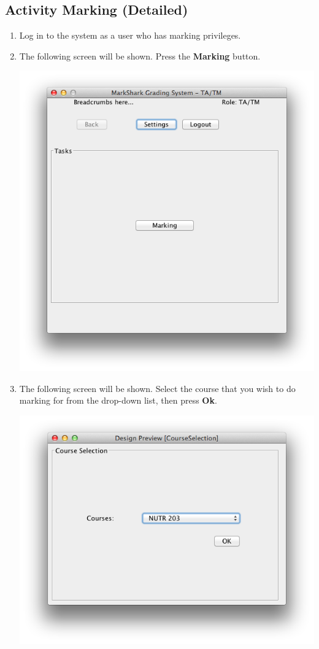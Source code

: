 \documentclass{article}
\begin{document}
\subsection{Activity Marking (Detailed)}
\begin{enumerate}
  \item Log in to the system as a user who has marking privileges.
  \item The following screen will be shown.  Press the \textbf{Marking} button.
  \begin{center} 
   \includegraphics[scale=0.55]{../images/UpdatedUIScreens/landingTA.png}
  \end{center}
  \item The following screen will be shown.  Select the course that you wish
    to do marking for from the drop-down list, then press \textbf{Ok}.
    \begin{center} 
     \includegraphics[scale=0.55]{../images/UpdatedUIScreens/CourseSelection.png}

\end{center}
\end{enumerate}
\end{document}
